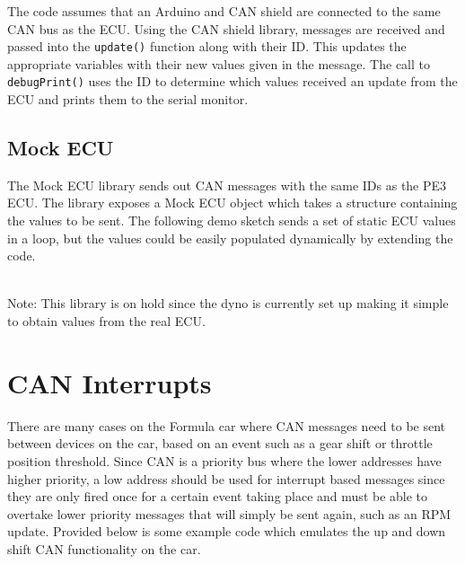 \documentclass[letterpaper]{article}
\begin{document}
\lstset{basicstyle=\ttfamily\scriptsize}

\lstset{basicstyle=\ttfamily}

The code assumes that an Arduino and CAN shield are connected to the same CAN
bus as the ECU. Using the CAN shield library, messages are received and passed
into the \lstinline{update()} function along with their ID. This updates the
appropriate variables with their new values given in the message. The call to
\lstinline{debugPrint()} uses the ID to determine which values received an
update from the ECU and prints them to the serial monitor.

\subsection{Mock ECU}
The Mock ECU library sends out CAN messages with the same IDs as the PE3 ECU.
The library exposes a Mock ECU object which takes a structure containing the values
to be sent. The following demo sketch sends a set of static ECU values in a loop,
but the values could be easily populated dynamically by extending the code.

\lstset{basicstyle=\ttfamily\scriptsize}

\\
Note: This library is on hold since the dyno is currently set up making it
simple to obtain values from the real ECU.

\section{CAN Interrupts}
There are many cases on the Formula car where CAN messages need to be sent
between devices on the car, based on an event such as a gear shift or throttle
position threshold. Since CAN is a priority bus where the lower addresses have
higher priority, a low address should be used for interrupt based messages since
they are only fired once for a certain event taking place and must be able to
overtake lower priority messages that will simply be sent again, such as an RPM
update. Provided below is some example code which emulates the up and down shift
CAN functionality on the car.\\
\\
\\


\lstset{basicstyle=\ttfamily}
\end{document}
